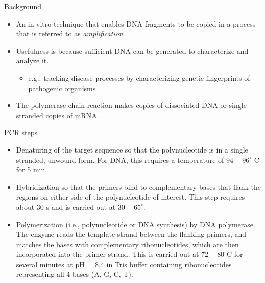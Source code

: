 \documentclass[
  ignorenonframetext,
  aspectratio=169]{beamer}
\providecommand{\tightlist}{%
  \setlength{\itemsep}{0pt}\setlength{\parskip}{0pt}}
\begin{document}
\begin{frame}{Background}
\protect\hypertarget{background-1}{}
\begin{itemize}
\tightlist
\item
  An in vitro technique that enables DNA fragments to be copied in a
  process that is referred to as \emph{amplification}.
\item
  Usefulness is because sufficient DNA can be generated to characterize
  and analyze it.

  \begin{itemize}
  \tightlist
  \item
    e.g.: tracking disease processes by characterizing genetic
    fingerprints of pathogenic organisms
  \end{itemize}
\item
  The polymerase chain reaction makes copies of dissociated DNA or
  single - stranded copies of mRNA.
\end{itemize}
\end{frame}

\begin{frame}{PCR steps}
\protect\hypertarget{pcr-steps}{}
\begin{itemize}
\tightlist
\item
  Denaturing of the target sequence so that the polynucleotide is in a
  single stranded, unwound form. For DNA, this requires a temperature of
  \(94-96^\circ\) C for 5 min.
\item
  Hybridization so that the primers bind to complementary bases that
  flank the regions on either side of the polynucleotide of interest.
  This step requires about 30 s and is carried out at \(30-65^\circ\).
\item
  Polymerization (i.e., polynucleotide or DNA synthesis) by DNA
  polymerase. The enzyme reads the template strand between the flanking
  primers, and matches the bases with complementary ribonucleotides,
  which are then incorporated into the primer strand. This is carried
  out at \(72-80^\circ\)C for several minutes at pH = 8.4 in Tris buffer
  containing ribonucleotides representing all 4 bases (A, G, C, T).
\end{itemize}
\end{frame}
\end{document}
